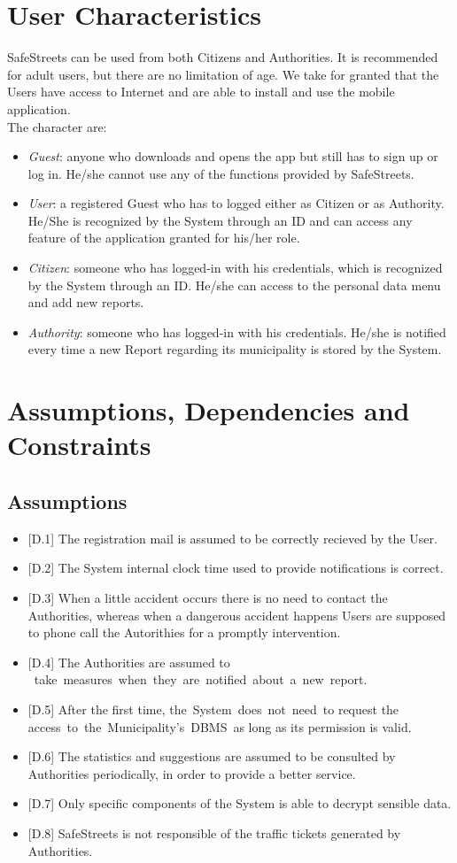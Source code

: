 \documentclass{report}
\begin{document}
\section{User Characteristics}
SafeStreets can be used from both Citizens and Authorities. It is recommended for adult users, but there are no limitation of age. 
We take for granted that the Users have access to Internet and are able to install and use the mobile application.\\
The character are:
\begin{itemize}
	\item \textit{Guest}: anyone who downloads and opens the app but still has to sign
	up or log in. He/she cannot use any of the functions provided by SafeStreets.
	\item \textit{User}: a registered Guest who has to logged either as Citizen or as Authority. He/She is recognized by the System through an ID and can access any feature of the application granted for his/her role.
	\item \textit{Citizen}: someone who has logged-in with his credentials, which is recognized by the System through an ID. He/she can access to the personal data menu and add new reports.
	\item \textit{Authority}: someone who has logged-in with his credentials. He/she is notified every time a new Report regarding its municipality is stored by the System.
\end{itemize}

\section{Assumptions, Dependencies and Constraints}
\subsection{Assumptions}
\begin{itemize}
	\item {[D.1]} The registration mail is assumed to be correctly recieved by the User.
	\item {[D.2]} The System internal clock time used to provide notifications is correct.
	\item {[D.3]} When a little accident occurs there is no need to contact the Authorities, whereas when a dangerous accident happens Users are supposed to phone call the Autorithies for a promptly intervention.
	\item {[D.4]} The Authorities are assumed to  take measures when they are notified about a new report.
	\item {[D.5]} After the first time, the System does not need to request the access to the Municipality's DBMS as long as its permission is valid.
	\item {[D.6]} The statistics and suggestions are assumed to be consulted by Authorities periodically, in order to provide a better service.
	\item {[D.7]} Only specific components of the System is able to decrypt sensible data.
	\item {[D.8]} SafeStreets is not responsible of the traffic tickets generated by Authorities.
\end{itemize}
\end{document}
